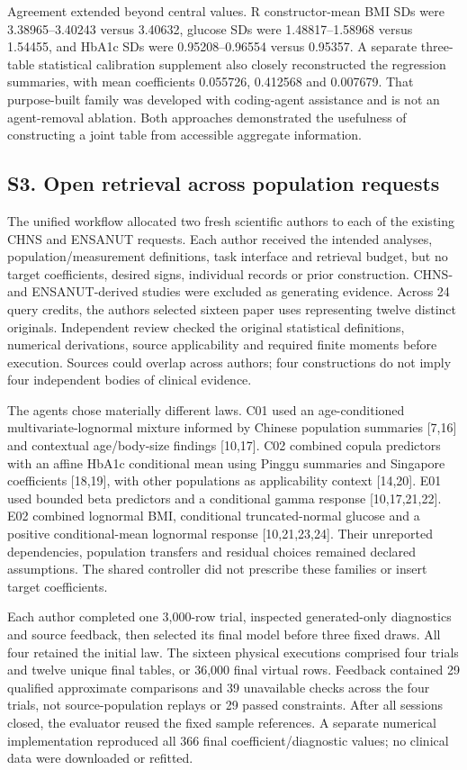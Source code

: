 \documentclass[sigconf,anonymous,review]{acmart}
\begin{document}
Agreement extended beyond central values. R constructor-mean BMI SDs were 3.38965–\allowbreak{}3.40243 versus 3.40632, glucose SDs were 1.48817–\allowbreak{}1.58968 versus 1.54455, and HbA1c SDs were 0.95208–\allowbreak{}0.96554 versus 0.95357. A separate three-table statistical calibration supplement also closely reconstructed the regression summaries, with mean coefficients 0.055726, 0.412568 and 0.007679. That purpose-built family was developed with coding-agent assistance and is not an agent-removal ablation. Both approaches demonstrated the usefulness of constructing a joint table from accessible aggregate information.


\subsection*{S3. Open retrieval across population requests}

The unified workflow allocated two fresh scientific authors to each of the existing CHNS and ENSANUT requests. Each author received the intended analyses, population/\allowbreak{}measurement definitions, task interface and retrieval budget, but no target coefficients, desired signs, individual records or prior construction. CHNS- and ENSANUT-derived studies were excluded as generating evidence. Across 24 query credits, the authors selected sixteen paper uses representing twelve distinct originals. Independent review checked the original statistical definitions, numerical derivations, source applicability and required finite moments before execution. Sources could overlap across authors; four constructions do not imply four independent bodies of clinical evidence.


The agents chose materially different laws. C01 used an age-conditioned multivariate-lognormal mixture informed by Chinese population summaries [7,16] and contextual age/\allowbreak{}body-size findings [10,17]. C02 combined copula predictors with an affine HbA1c conditional mean using Pinggu summaries and Singapore coefficients [18,19], with other populations as applicability context [14,20]. E01 used bounded beta predictors and a conditional gamma response [10,17,21,22]. E02 combined lognormal BMI, conditional truncated-normal glucose and a positive conditional-mean lognormal response [10,21,23,24]. Their unreported dependencies, population transfers and residual choices remained declared assumptions. The shared controller did not prescribe these families or insert target coefficients.


Each author completed one 3,000-row trial, inspected generated-only diagnostics and source feedback, then selected its final model before three fixed draws. All four retained the initial law. The sixteen physical executions comprised four trials and twelve unique final tables, or 36,000 final virtual rows. Feedback contained 29 qualified approximate comparisons and 39 unavailable checks across the four trials, not source-population replays or 29 passed constraints. After all sessions closed, the evaluator reused the fixed sample references. A separate numerical implementation reproduced all 366 final coefficient/\allowbreak{}diagnostic values; no clinical data were downloaded or refitted.
\end{document}
